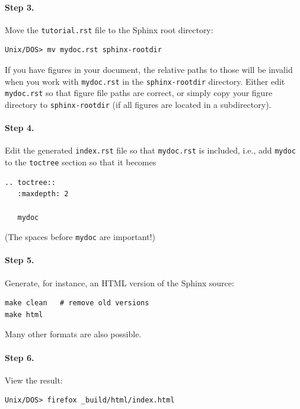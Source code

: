 \documentclass{article}
\begin{document}
\paragraph{Step 3.}
Move the {\fontsize{10pt}{10pt}\verb!tutorial.rst!} file to the Sphinx root directory:
\begin{Verbatim}[fontsize=\fontsize{9pt}{9pt},tabsize=8,baselinestretch=0.85,
fontfamily=tt,xleftmargin=7mm]
Unix/DOS> mv mydoc.rst sphinx-rootdir
\end{Verbatim}
\noindent
If you have figures in your document, the relative paths to those will
be invalid when you work with {\fontsize{10pt}{10pt}\verb!mydoc.rst!} in the {\fontsize{10pt}{10pt}\verb!sphinx-rootdir!}
directory. Either edit {\fontsize{10pt}{10pt}\verb!mydoc.rst!} so that figure file paths are correct,
or simply copy your figure directory to {\fontsize{10pt}{10pt}\verb!sphinx-rootdir!} (if all figures
are located in a subdirectory).

\paragraph{Step 4.}
Edit the generated {\fontsize{10pt}{10pt}\verb!index.rst!} file so that {\fontsize{10pt}{10pt}\verb!mydoc.rst!}
is included, i.e., add {\fontsize{10pt}{10pt}\verb!mydoc!} to the {\fontsize{10pt}{10pt}\verb!toctree!} section so that it becomes
\begin{Verbatim}[fontsize=\fontsize{9pt}{9pt},tabsize=8,baselinestretch=0.85,
fontfamily=tt,xleftmargin=7mm]
.. toctree::
   :maxdepth: 2

   mydoc
\end{Verbatim}
\noindent
(The spaces before {\fontsize{10pt}{10pt}\verb!mydoc!} are important!)

\paragraph{Step 5.}
Generate, for instance, an HTML version of the Sphinx source:
\begin{Verbatim}[fontsize=\fontsize{9pt}{9pt},tabsize=8,baselinestretch=0.85,
fontfamily=tt,xleftmargin=7mm]
make clean   # remove old versions
make html
\end{Verbatim}
\noindent
Many other formats are also possible.

\paragraph{Step 6.}
View the result:
\begin{Verbatim}[fontsize=\fontsize{9pt}{9pt},tabsize=8,baselinestretch=0.85,
fontfamily=tt,xleftmargin=7mm]
Unix/DOS> firefox _build/html/index.html
\end{Verbatim}
\noindent
\end{document}
